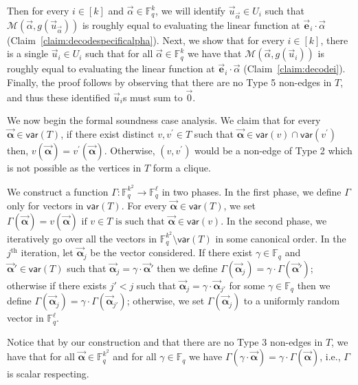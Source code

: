 \documentclass[11pt]{article}
\newcommand{\F}{\mathbb{F}}
\newcommand{\alphab}{\vec{\bm{\alpha}}}
\newcommand{\var}{\mathsf{var}}
\newcommand{\cs}[1]{{$<<$\color{violet!50!red!50!blue}{\bf Karthik:} #1 $>>$}}
\newcommand{\M}{\mathcal{M}}
\begin{document}
Then for every $i\in[k]$ and $\vec{\alpha}\in\F_q^k$, we will identify  $\vec{u}_{\vec{\alpha}}\in U_i$ such that $\M(\vec{\alpha},g(\vec{u}_{\vec{\alpha}}))$ is roughly equal to evaluating the linear function at $\vec{\bm e}_i\cdot \vec{\alpha}$ (Claim~\ref{claim:decodespecificalpha}). Next, we show that for every $i\in[k]$, there is a single $\vec{u}_i\in U_i$  such that for all $\vec{\alpha}\in \F_q^k$ we have that  $\M(\vec{\alpha},g(\vec{u}_i))$ is roughly equal to evaluating the linear function at $\vec{\bm e}_i\cdot \vec{\alpha}$ (Claim~\ref{claim:decodei}). Finally, the proof follows by  observing that there are no Type 5 non-edges in $T$, and thus   these identified $\vec{u}_i$s must sum to $\vec{0}$. 


We now begin the formal soundness case analysis. We claim that for every $\alphab\in \var(T)$, if there exist distinct $v,v^{\prime}\in T$ such that $\alphab\in \var(v)\cap\var(v^{\prime})$ then, $v(\alphab)=v^{\prime}(\alphab)$. Otherwise, $(v,v^{\prime})$ would be a non-edge of Type 2 which is not possible as the vertices in $T$ form a clique. %

We construct a function $\Gamma:\F_q^{k^2}\to \F_q^\ell$  in two phases. In the first phase, we define $\Gamma$ only for vectors in $\var(T)$.   For every $\vec{\bm{\alpha}}\in\var(T)$, we set $
\Gamma(\vec{\bm{\alpha}})=
v(\vec{\bm{\alpha}})\text{ if }v\in T\text{ is such that }\vec{\bm{\alpha}}\in \var(v)$.
In the second phase, 
we iteratively go over all the vectors in $\F_q^{k^2}\setminus \var(T)$ in some canonical order. In the $j^{\text{th}}$ iteration, let $\alphab_j$ be the vector considered. If there exist $\gamma\in \F_q$ and $\alphab'\in \var(T)$ such that $\alphab_j=\gamma\cdot \alphab'$ then we define $\Gamma(\alphab_j)=\gamma\cdot \Gamma(\alphab')$; otherwise if there exists $j'<j$ such that $\alphab_j=\gamma\cdot \alphab_{j'}$ for some $\gamma\in\F_q$ then we define $\Gamma(\alphab_j)=\gamma\cdot \Gamma(\alphab_{j'})$; otherwise, we set $\Gamma(\alphab_j)$ to a uniformly random vector in $\F_q^\ell$. 

Notice that by our construction and that there are no Type 3 non-edges in $T$, we have that for all $\alphab\in \F_q^{k^2}$ and for all $\gamma\in \F_q$ we have $\Gamma(\gamma\cdot\alphab)=\gamma\cdot \Gamma(\alphab)$, i.e., $\Gamma$ is scalar respecting. 
\end{document}
